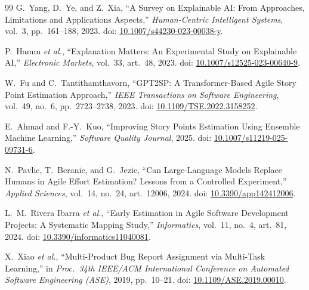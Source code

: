 \documentclass[conference]{IEEEtran}
\begin{document}
\begin{thebibliography}{99}
	G.\ Yang, D.\ Ye, and Z.\ Xia,
	``A Survey on Explainable AI: From Approaches, Limitations and Applications
	Aspects,''
	\emph{Human-Centric Intelligent Systems},
	vol.~3, pp.~161--188, 2023.
	doi: \href{https://doi.org/10.1007/s44230-023-00038-y}{10.1007/s44230-023-00038-y}.

	P.\ Hamm \emph{et al.},
	``Explanation Matters: An Experimental Study on Explainable AI,''
	\emph{Electronic Markets},
	vol.~33, art.~48, 2023.
	doi: \href{https://doi.org/10.1007/s12525-023-00640-9}{10.1007/s12525-023-00640-9}.

	W.\ Fu and C.\ Tantithamthavorn,
	``GPT2SP: A Transformer-Based Agile Story Point Estimation Approach,''
	\emph{IEEE Transactions on Software Engineering},
	vol.~49, no.~6, pp.~2723--2738, 2023.
	doi: \href{https://doi.org/10.1109/TSE.2022.3158252}{10.1109/TSE.2022.3158252}.

	E.\ Ahmad and F.-Y.\ Kuo,
	``Improving Story Points Estimation Using Ensemble Machine Learning,''
	\emph{Software Quality Journal}, 2025.
	doi: \href{https://doi.org/10.1007/s11219-025-09731-6}{10.1007/s11219-025-09731-6}.

	N.\ Pavlic, T.\ Beranic, and G.\ Jezic,
	``Can Large-Language Models Replace Humans in Agile Effort Estimation? Lessons from
	a Controlled Experiment,''
	\emph{Applied Sciences},
	vol.~14, no.~24, art.~12006, 2024.
	doi: \href{https://doi.org/10.3390/app142412006}{10.3390/app142412006}.

	L.\ M.\ Rivera Ibarra \emph{et al.},
	``Early Estimation in Agile Software Development Projects: A Systematic Mapping
	Study,''
	\emph{Informatics},
	vol.~11, no.~4, art.~81, 2024.
	doi: \href{https://doi.org/10.3390/informatics11040081}{10.3390/informatics11040081}.

	X.\ Xiao \emph{et al.},
	``Multi-Product Bug Report Assignment via Multi-Task Learning,''
	in \emph{Proc.\ 34th IEEE/ACM International Conference on Automated Software
		Engineering (ASE)}, 2019, pp.~10--21.
	doi: \href{https://doi.org/10.1109/ASE.2019.00010}{10.1109/ASE.2019.00010}.

\end{thebibliography}
\end{document}
